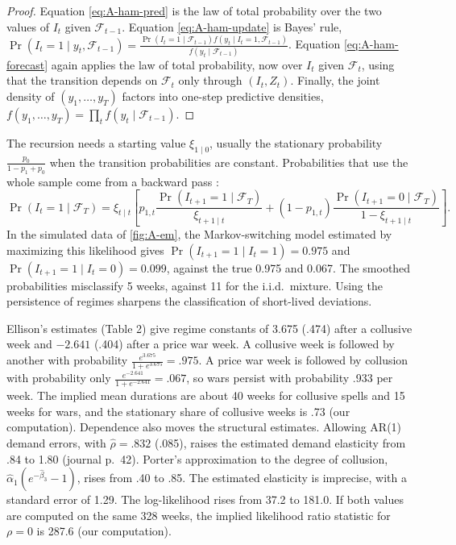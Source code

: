 \begin{proof}
Equation \eqref{eq:A-ham-pred} is the law of total probability over the two values of $I_t$ given $\mathcal{F}_{t-1}$. Equation
\eqref{eq:A-ham-update} is Bayes' rule, $\Pr(I_t = 1 \mid y_t, \mathcal{F}_{t-1}) = \frac{\Pr(I_t = 1 \mid \mathcal{F}_{t-1})
f(y_t \mid I_t = 1, \mathcal{F}_{t-1})}{f(y_t \mid \mathcal{F}_{t-1})}$. Equation \eqref{eq:A-ham-forecast} again applies the law of
total probability, now over $I_t$ given $\mathcal{F}_t$, using that the transition depends on $\mathcal{F}_t$ only through
$(I_t, Z_t)$. Finally, the joint density of $(y_1, \dots, y_T)$ factors into one-step predictive densities,
$f(y_1, \dots, y_T) = \prod_tf(y_t \mid \mathcal{F}_{t-1})$.
\end{proof}

The recursion needs a starting value $\xi_{1 \mid 0}$, usually the stationary probability $\frac{p_0}{1 - p_1 + p_0}$ when the
transition probabilities are constant. Probabilities that use the whole sample come from a backward pass
\citep{Kim1994}:
\begin{equation*}
  \Pr(I_t = 1 \mid \mathcal{F}_T) = \xi_{t \mid t}\left[p_{1,t}\frac{\Pr(I_{t+1} = 1 \mid \mathcal{F}_T)}{\xi_{t+1 \mid t}} +
  (1 - p_{1,t})\frac{\Pr(I_{t+1} = 0 \mid \mathcal{F}_T)}{1 - \xi_{t+1 \mid t}}\right].
\end{equation*}
In the simulated data of \cref{fig:A-em}, the Markov-switching model estimated by maximizing this likelihood gives
$\Pr(I_{t+1} = 1 \mid I_t = 1) = 0.975$ and $\Pr(I_{t+1} = 1 \mid I_t = 0) = 0.099$, against the true 0.975 and 0.067. The
smoothed probabilities misclassify 5 weeks, against 11 for the i.i.d.\ mixture. Using the persistence of regimes sharpens
the classification of short-lived deviations.

Ellison's estimates (Table 2) give regime constants of 3.675 (.474) after a collusive week and $-2.641$ (.404) after a price
war week. A collusive week is followed by another with probability $\frac{e^{3.675}}{1 + e^{3.675}} = .975$. A price war week
is followed by collusion with probability only $\frac{e^{-2.641}}{1 + e^{-2.641}} = .067$, so wars persist with probability
.933 per week. The implied mean durations are about 40 weeks for collusive spells and 15 weeks for wars, and the stationary
share of collusive weeks is .73 (our computation). Dependence also moves the structural estimates. Allowing AR(1) demand
errors, with $\hat\rho = .832$ (.085), raises the estimated demand elasticity from .84 to 1.80 (journal p.~42). Porter's
approximation to the degree of collusion, $\hat\alpha_1(e^{-\hat\beta_3} - 1)$, rises from .40 to .85. The estimated elasticity is
imprecise, with a standard error of 1.29. The log-likelihood rises from 37.2 to 181.0. If both values are computed on the
same 328 weeks, the implied likelihood ratio statistic for $\rho = 0$ is 287.6 (our computation).

